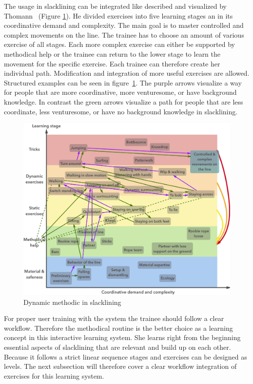 The usage in slacklining can be integrated like described and visualized by Thomann~\cite{Thomann2013-aa} (Figure \ref{fig:3_3_1_dynamicMethod}). He divided exercises into five learning stages an in its coordinative demand and complexity. The main goal is to master controlled and complex movements on the line. The trainee has to choose an amount of various exercise of all stages. Each more complex exercise can either be supported by methodical help or the trainee can return to the lower stage to learn the movement for the specific exercise. Each trainee can therefore create her individual path. Modification and integration of more useful exercises are allowed. Structured examples can be seen in figure~\ref{fig:3_3_1_dynamicMethod}. The purple arrows visualize a way for people that are more coordinative, more venturesome, or have background knowledge. In contrast the green arrows visualize a path for people that are less coordinate, less venturesome, or have no background knowledge in slacklining.

\begin{figure}[htb]
	\centering
	\begin{minipage}[t]{1\linewidth}
		\centering
		\includegraphics[width=1\linewidth]{Pictures/3_3_1_dynamicMethod3}
		\caption{Dynamic methodic in slacklining~\cite{Thomann2013-aa}}
		\label{fig:3_3_1_dynamicMethod}
	\end{minipage}
\end{figure}

For proper user training with the system the trainee should follow a clear workflow. Therefore the methodical routine is the better choice as a learning concept in this interactive learning system. She learns right from the beginning essential aspects of slacklining that are relevant and build up on each other. Because it follows a strict linear sequence stages and exercises can be designed as levels. 
The next subsection \textit{} will therefore cover a clear workflow integration of exercises for this learning system.


